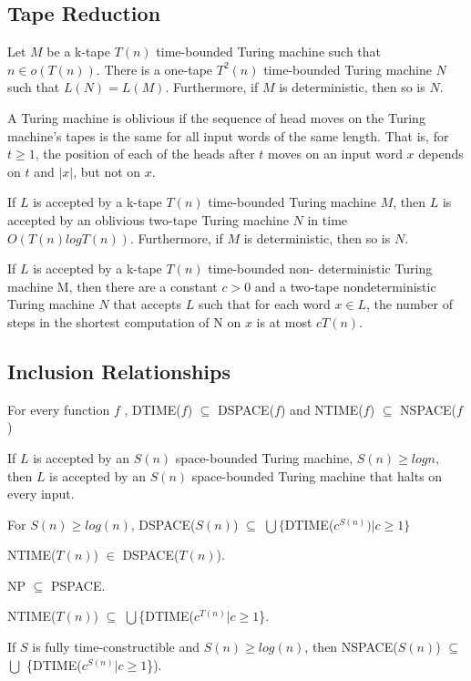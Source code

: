 \subsection{Tape Reduction}

 Let $M$ be a k-tape $T(n)$ time-bounded Turing machine
such that $n \in o(T(n))$. There is a one-tape $T^2(n)$ time-bounded
Turing machine
$N$ such that $L(N) = L(M)$. Furthermore, if $M$ is deterministic, then so is
$N$.

A Turing machine is oblivious if the sequence of head moves on
the
Turing machine's tapes is the same for all input words of the same
length. That is,
for $t \ge 1$, the position of each of the heads after $t$ moves on an
input word $x$ depends on $t$ and $|x|$, but not on $x$.

 If $L$ is accepted by a k-tape $T(n)$ time-bounded
Turing machine $M$, then $L$ is accepted by an oblivious two-tape Turing machine
$N$ in time $O(T(n)logT(n))$. Furthermore, if $M$ is deterministic, then so is
$N$.

 If $L$ is accepted by a k-tape $T(n)$ time-bounded non-
deterministic Turing machine M, then there are a constant $c > 0$ and a two-tape
nondeterministic Turing machine $N$ that accepts $L$ such that for each word
$x \in L$,
the number of steps in the shortest computation of N on $x$ is at most $cT(n)$.

\subsection{Inclusion Relationships}

 For every function $f$ ,
DTIME($f$) $\subseteq$ DSPACE($f$) and NTIME($f$) $\subseteq$ NSPACE($f$)

 If $L$ is accepted by an $S(n)$ space-bounded Turing machine, 
$S(n) \ge log n$, then $L$ is accepted by an $S(n)$ space-bounded
Turing machine that halts on every input.

 For $S(n) \ge log(n)$,
DSPACE($S(n)$) $\subseteq$ $\bigcup \{$DTIME($c^{S(n)}) | c \ge 1 \}$

  NTIME($T(n)$) $\in$ DSPACE($T(n)$).

 NP $\subseteq$ PSPACE.

 NTIME($T(n)$) $\subseteq$ $\bigcup$\{DTIME($c^{T(n)}| c \ge 1$\}.

 If $S$ is fully time-constructible and $S(n) \ge
log(n)$, then NSPACE($S(n)$) $\subseteq$ $\bigcup$ \{DTIME($c^{S(n)}|c \ge 1$\}).

